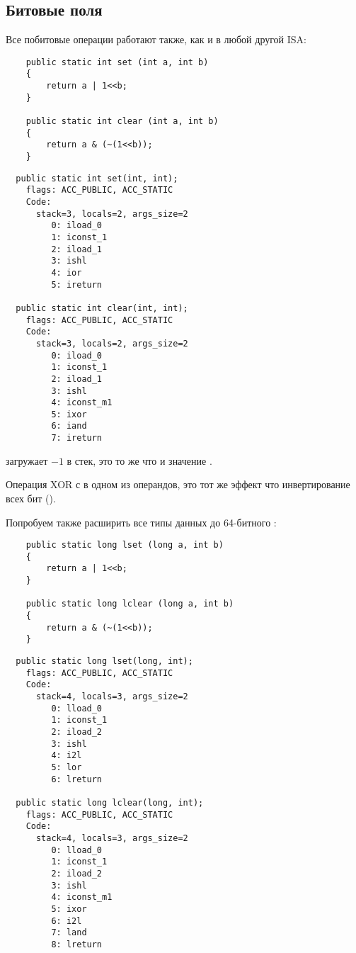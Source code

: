 \subsection{Битовые поля}


Все побитовые операции работают также, как и в любой другой \ac{ISA}:

\begin{lstlisting}
	public static int set (int a, int b) 
	{
		return a | 1<<b;
	}

	public static int clear (int a, int b) 
	{
		return a & (~(1<<b));
	}
\end{lstlisting}

\begin{lstlisting}
  public static int set(int, int);
    flags: ACC_PUBLIC, ACC_STATIC
    Code:
      stack=3, locals=2, args_size=2
         0: iload_0       
         1: iconst_1      
         2: iload_1       
         3: ishl          
         4: ior           
         5: ireturn       

  public static int clear(int, int);
    flags: ACC_PUBLIC, ACC_STATIC
    Code:
      stack=3, locals=2, args_size=2
         0: iload_0       
         1: iconst_1      
         2: iload_1       
         3: ishl          
         4: iconst_m1     
         5: ixor          
         6: iand          
         7: ireturn       
\end{lstlisting}


 загружает $-1$ в стек, это то же что и значение .

Операция XOR с  в одном из операндов, это тот же эффект что инвертирование всех бит ().


Попробуем также расширить все типы данных до 64-битного :

\begin{lstlisting}
	public static long lset (long a, int b) 
	{
		return a | 1<<b;
	}

	public static long lclear (long a, int b) 
	{
		return a & (~(1<<b));
	}
\end{lstlisting}

\begin{lstlisting}
  public static long lset(long, int);
    flags: ACC_PUBLIC, ACC_STATIC
    Code:
      stack=4, locals=3, args_size=2
         0: lload_0       
         1: iconst_1      
         2: iload_2       
         3: ishl          
         4: i2l           
         5: lor           
         6: lreturn       

  public static long lclear(long, int);
    flags: ACC_PUBLIC, ACC_STATIC
    Code:
      stack=4, locals=3, args_size=2
         0: lload_0       
         1: iconst_1      
         2: iload_2       
         3: ishl          
         4: iconst_m1     
         5: ixor          
         6: i2l           
         7: land          
         8: lreturn       
\end{lstlisting}


